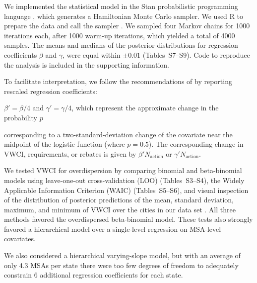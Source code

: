 \documentclass[draft,linenumbers]{agujournal}
\begin{document}
We implemented the statistical model in the Stan probabilistic programming
language \citep{carpenter:stan:2016}, which generates a Hamiltonian Monte Carlo
sampler.
We used R to prepare the data and call the sampler \citep{r.manual:2016}.
We
sampled four Markov chains for 1000 iterations each, after 1000 warm-up iterations,
which yielded a total of 4000 samples.
The means and medians of the posterior distributions for
regression coefficients $\beta$ and $\gamma$, were equal within $\pm 0.01$
(Tables~S7--S9).
Code to reproduce the analysis is included in the supporting information.

To facilitate interpretation, we
follow the recommendations of \citet[pp.~81--82]{gelman:arm:2007} by reporting
rescaled regression coefficients:
\iffalse
$\beta' = N_{\text{action}} \beta / 4$ and $\gamma' = N_{\text{action}} \gamma / 4$,
which represent the approximate change in VWCI (or requirements or rebates)
\else
$\beta' = \beta / 4$ and $\gamma' = \gamma / 4$, which represent
the approximate change in the probability $p$
\fi
corresponding to a two-standard-deviation change of the covariate near the
midpoint of the logistic function (where $p = 0.5$).
The corresponding change in VWCI, requirements, or rebates is given by
$\beta' N_{\text{action}}$ or $\gamma' N_{\text{action}}$.

We tested VWCI for overdispersion by comparing binomial and beta-binomial models
using leave-one-out cross-validation (LOO)
(Tables~S3--S4),
the Widely Applicable Information Criterion (WAIC)
(Tables~S5--S6),
and
visual
inspection of the distribution of posterior predictions of the mean, standard
deviation, maximum, and minimum of VWCI over the cities in our data
set \citep{gelman:bda:2014,vehtari:loo:2016}.
All three methods favored the overdispersed beta-binomial model.
These tests also strongly favored a
hierarchical
model over a single-level regression on MSA-level covariates.

We also considered a hierarchical varying-slope model, but with an average
of only 4.3 MSAs per state there were too
few degrees of freedom to adequately constrain 6
additional regression coefficients for each state.
\end{document}
